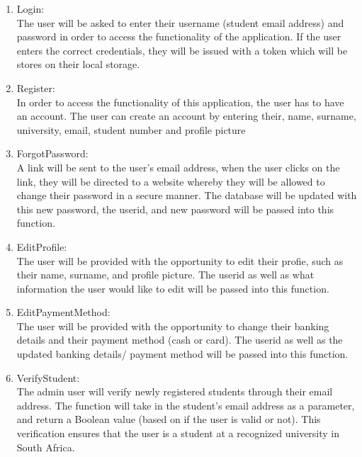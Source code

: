 \documentclass[hidelinks, 12pt, a4paper]{article}
\begin{document}
\begin{enumerate}[label=U1.\arabic*]

      \item Login:\\
            The user will be asked to enter their username (student email address) and password in order to access the functionality of the application. If the user enters the correct credentials, they will be issued with a token which will be stores on their local storage.

      \item Register:\\
            In order to access the functionality of this application, the user has to have an account. The user can create an account by entering their, name, surname, university, email, student number and profile picture

      \item ForgotPassword:\\
            A link will be sent to the user’s email address, when the user clicks on the link, they will be directed to a website whereby they will be allowed to change their password in a secure manner. The database will be updated with this new password, the userid, and new password will be passed into this function.

      \item EditProfile: \\
            The user will be provided with the opportunity to edit their profie, such as their name, surname, and profile picture. The userid as well as what information the user would like to edit will be passed into this function.

      \item EditPaymentMethod:\\
            The user will be provided with the opportunity to change their banking details and their payment method (cash or card). The userid as well as the updated banking details/ payment method will be passed into this function.

      \item VerifyStudent:\\
            The admin user will verify newly registered students through their email address. The function will take in the student’s email address as a parameter, and return a Boolean value (based on if the user is valid or not). This verification ensures that the user is a student at a recognized university in South Africa.


\end{enumerate}
\end{document}
